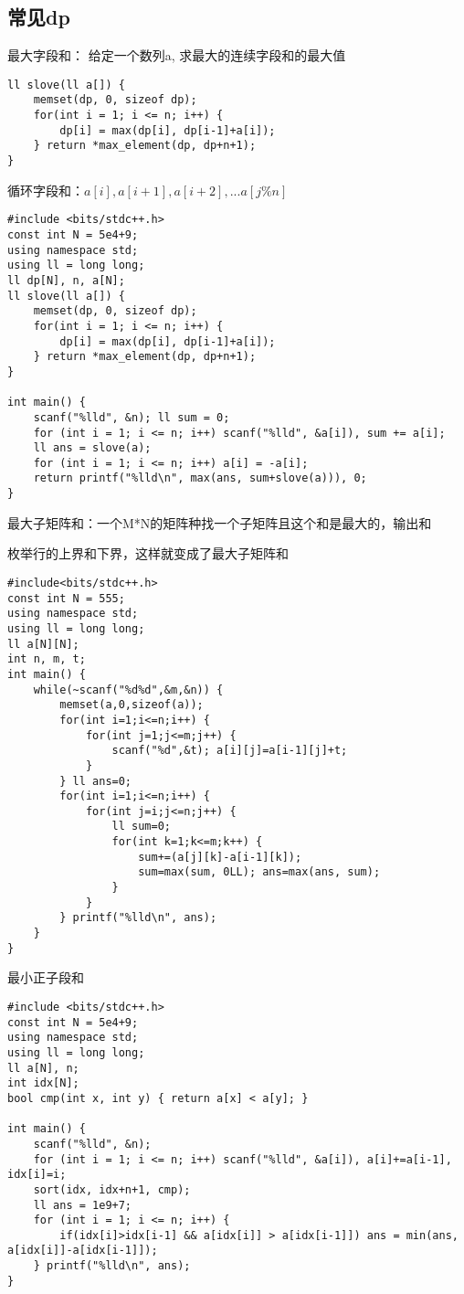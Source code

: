 \subsection{常见dp}

最大字段和： 给定一个数列a, 求最大的连续字段和的最大值

\begin{lstlisting}
ll slove(ll a[]) {
    memset(dp, 0, sizeof dp);
    for(int i = 1; i <= n; i++) {
        dp[i] = max(dp[i], dp[i-1]+a[i]);
    } return *max_element(dp, dp+n+1);
}
\end{lstlisting}

循环字段和：$a[i],a[i+1],a[i+2],...a[j\%n]$


\begin{lstlisting}
#include <bits/stdc++.h>
const int N = 5e4+9;
using namespace std;
using ll = long long;
ll dp[N], n, a[N];
ll slove(ll a[]) {
    memset(dp, 0, sizeof dp);
    for(int i = 1; i <= n; i++) {
        dp[i] = max(dp[i], dp[i-1]+a[i]);
    } return *max_element(dp, dp+n+1);
}

int main() {
    scanf("%lld", &n); ll sum = 0;
    for (int i = 1; i <= n; i++) scanf("%lld", &a[i]), sum += a[i];
    ll ans = slove(a);
    for (int i = 1; i <= n; i++) a[i] = -a[i];
    return printf("%lld\n", max(ans, sum+slove(a))), 0;
}
\end{lstlisting}

最大子矩阵和：一个M*N的矩阵种找一个子矩阵且这个和是最大的，输出和

枚举行的上界和下界，这样就变成了最大子矩阵和

\begin{lstlisting}
#include<bits/stdc++.h>
const int N = 555;
using namespace std;
using ll = long long;
ll a[N][N];
int n, m, t;
int main() {
    while(~scanf("%d%d",&m,&n)) {
        memset(a,0,sizeof(a));
        for(int i=1;i<=n;i++) {
            for(int j=1;j<=m;j++) {
                scanf("%d",&t); a[i][j]=a[i-1][j]+t;
            }
        } ll ans=0;
        for(int i=1;i<=n;i++) {
            for(int j=i;j<=n;j++) {
                ll sum=0;
                for(int k=1;k<=m;k++) {
                    sum+=(a[j][k]-a[i-1][k]);
                    sum=max(sum, 0LL); ans=max(ans, sum);
                }
            }
        } printf("%lld\n", ans);
    }
}
\end{lstlisting}

最小正子段和

\begin{lstlisting}
#include <bits/stdc++.h>
const int N = 5e4+9;
using namespace std;
using ll = long long;
ll a[N], n;
int idx[N];
bool cmp(int x, int y) { return a[x] < a[y]; }

int main() {
    scanf("%lld", &n);
    for (int i = 1; i <= n; i++) scanf("%lld", &a[i]), a[i]+=a[i-1], idx[i]=i;
    sort(idx, idx+n+1, cmp);
    ll ans = 1e9+7;
    for (int i = 1; i <= n; i++) {
        if(idx[i]>idx[i-1] && a[idx[i]] > a[idx[i-1]]) ans = min(ans, a[idx[i]]-a[idx[i-1]]);
    } printf("%lld\n", ans);
}
\end{lstlisting}

